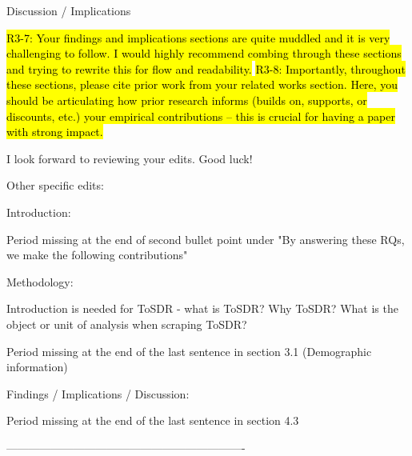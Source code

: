Discussion / Implications

\hl{R3-7: Your findings and implications sections are quite muddled and it is very
challenging to follow. I would highly recommend combing through these
sections and trying to rewrite this for flow and readability.}
\hl{R3-8: Importantly, throughout these sections, please cite prior work from
your related works section. Here, you should be articulating how prior
research informs (builds on, supports, or discounts, etc.) your
empirical contributions -- this is crucial for having a paper with
strong impact.}

I look forward to reviewing your edits. Good luck!

Other specific edits:

Introduction:

Period missing at the end of second bullet point under "By answering these RQs, we
make the following contributions"

Methodology:

Introduction is needed for ToSDR - what is ToSDR? Why ToSDR? What is the object or
unit of analysis when scraping ToSDR?

Period missing at the end of the last sentence in section 3.1 (Demographic
information)

Findings / Implications / Discussion:

Period missing at the end of the last sentence in section 4.3

----------------------------------------------------------------

